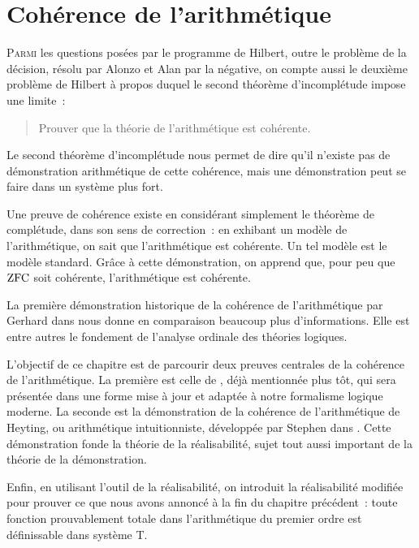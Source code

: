\chapter{Cohérence de l'arithmétique}
\label{chp.coh.arith}

\minitoc

\lettrine{P}{armi} les questions posées par le programme de Hilbert, outre le
problème de la décision, résolu par Alonzo  et Alan 
par la négative, on compte aussi le deuxième problème de Hilbert à propos duquel
le second théorème d'incomplétude impose une limite~:
\begin{quotation}
  \noindent
  Prouver que la théorie de l'arithmétique est cohérente.
\end{quotation}

Le second théorème d'incomplétude nous permet de dire qu'il n'existe pas de
démonstration arithmétique de cette cohérence, mais une démonstration peut se
faire dans un système plus fort.

Une preuve de cohérence existe en considérant simplement le théorème de
complétude, dans son sens de correction~: en exhibant un modèle de
l'arithmétique, on sait que l'arithmétique est cohérente. Un tel modèle est
le modèle standard. Grâce à cette démonstration, on apprend que, pour peu que
$\operatorname{ZFC}$ soit cohérente, l'arithmétique est cohérente.

La première démonstration historique de la cohérence de l'arithmétique par
Gerhard  dans \cite{Gentzen1936} nous donne en comparaison
beaucoup plus d'informations. Elle est entre autres le fondement de l'analyse
ordinale des théories logiques.

L'objectif de ce chapitre est de parcourir deux preuves centrales de la
cohérence de l'arithmétique. La première est celle de , déjà
mentionnée plus tôt, qui sera présentée dans une forme mise à jour et adaptée à
notre formalisme logique moderne. La seconde est la démonstration de la
cohérence de l'arithmétique de Heyting, ou arithmétique intuitionniste,
développée par Stephen  dans \cite{Kleene1945}. Cette démonstration
fonde la théorie de la réalisabilité, sujet tout aussi important de la théorie
de la démonstration.

Enfin, en utilisant l'outil de la réalisabilité, on introduit la réalisabilité
modifiée pour prouver ce que nous avons annoncé à la fin du chapitre précédent~:
toute fonction prouvablement totale dans l'arithmétique du premier ordre est
définissable dans système T.

